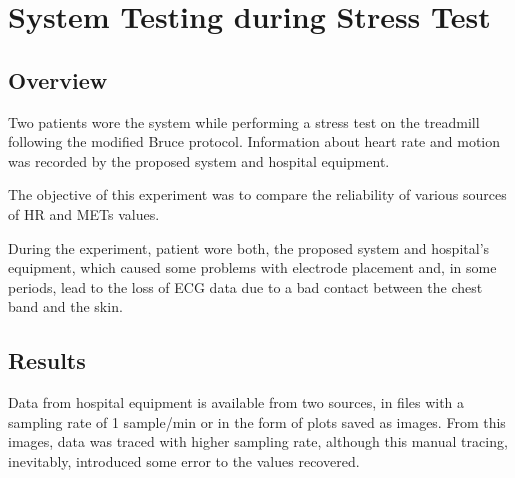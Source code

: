 
\chapter{System Testing during Stress Test}

\section{Overview}

Two patients wore the system while performing a stress test on the treadmill following the modified Bruce protocol. Information about heart rate and motion was recorded by the proposed system and hospital equipment.

The objective of this experiment was to compare the reliability of various sources of HR and METs values.

During the experiment, patient wore both, the proposed system and hospital's equipment, which caused some problems with electrode placement and, in some periods, lead to the loss of ECG data due to a bad contact between the chest band and the skin.

\FloatBarrier
\section{Results}

Data from hospital equipment is available from two sources, in files with a sampling rate of 1 sample/min or in the form of plots saved as images. From this images, data was traced with higher sampling rate, although this manual tracing, inevitably, introduced some error to the values recovered.

